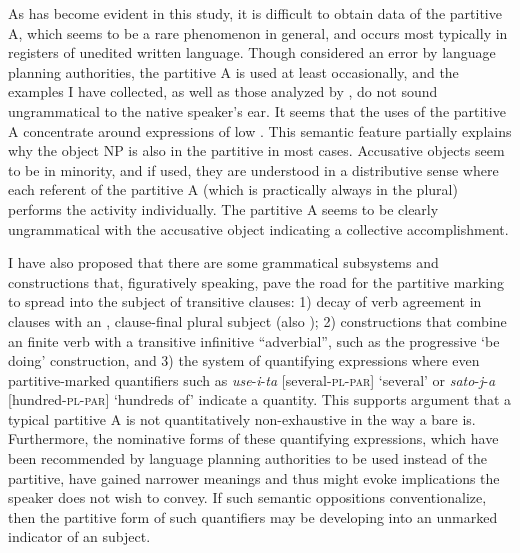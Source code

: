 \documentclass[output=paper]{LSP/langsci}
\begin{document}
As has become evident in this study, it is difficult to obtain data of the partitive A, which seems to be a rare phenomenon in general, and occurs most typically in registers of unedited written language. Though considered an error by language planning authorities, the partitive A is used at least occasionally, and the examples I have collected, as well as those analyzed by \citet{Yli-Vakkuri1979Partitiivisubjektin}, do not sound ungrammatical to the native speaker’s ear. It seems that the uses of the partitive A concentrate around  expressions of low . This semantic feature partially explains why the object NP is also in the partitive in most cases. Accusative objects seem to be in minority, and if used, they are understood in a distributive sense where each referent of the partitive A (which is practically always in the plural) performs the activity individually. The partitive A seems to be clearly ungrammatical with the accusative object indicating a collective accomplishment.

I have also proposed that there are some grammatical subsystems and constructions that, figuratively speaking, pave the road for the partitive marking to spread into the subject of transitive clauses: 1) decay of verb agreement in clauses with an , clause-final plural subject (\cf also \citealt{DeSmit2016Fluid}); 2) constructions that combine an  finite verb with a transitive infinitive “adverbial”, such as the progressive ‘be doing’ construction, and 3) the system of quantifying expressions where even partitive-marked quantifiers such as \textit{use}-\textit{i}-\textit{ta} [several-\textsc{pl}-\textsc{par}] ‘several’ or \textit{sato}-\textit{j}-\textit{a} [hundred-\textsc{pl}-\textsc{par}] ‘hundreds of’ indicate a  quantity. This supports  argument that a typical partitive A is not quantitatively non-exhaustive in the way a bare  is. Furthermore, the nominative forms of these quantifying expressions, which have been recommended by language planning authorities to be used instead of the partitive, have gained narrower  meanings and thus might evoke implications the speaker does not wish to convey. If such semantic oppositions conventionalize, then the partitive form of such quantifiers may be developing into an unmarked indicator of an  subject.
\end{document}
